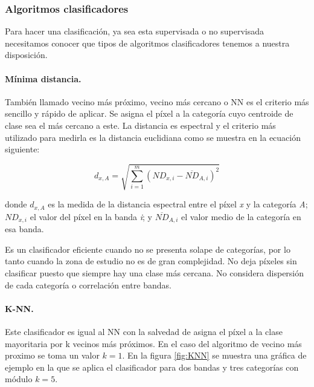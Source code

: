 \subsubsection{Algoritmos clasificadores}
Para hacer una clasificación, ya sea esta supervisada o no supervisada necesitamos conocer que tipos de algoritmos clasificadores tenemos a nuestra disposición.

\paragraph{Mínima distancia.}
También llamado vecino más próximo, vecino más cercano o \ac{NN} es el criterio más sencillo y rápido de aplicar. Se asigna el píxel a la categoría cuyo centroide de clase sea el más cercano a este.  La distancia es espectral y el criterio más utilizado para medirla es la distancia euclidiana como se muestra en la ecuación siguiente:

\begin{equation}
d_{x,A}=\sqrt{\displaystyle\sum_{i=1}^{m}(ND_{x,i}-\overline{ND}_{A,i})^{2}}
\end{equation}%

\noindent donde $d_{x,A}$ es la medida de la distancia espectral entre el píxel \textit{x} y la categoría \textit{A}; $ND_{x,i}$ el valor del píxel en la banda \textit{i}; y $\overline{ND}_{A,i}$ el valor medio de la categoría en esa banda.%

Es un clasificador eficiente cuando no se presenta solape de categorías, por lo tanto cuando la zona de estudio no es de gran complejidad. No deja píxeles sin clasificar puesto que siempre hay una clase más cercana. No considera dispersión de cada categoría o correlación entre bandas.

\paragraph{\ac{K-NN}.}
Este clasificador es igual al \ac{NN} con la salvedad de asigna el píxel a la clase mayoritaria por k vecinos más próximos. En el caso del algoritmo de vecino más proximo se toma un valor $k=1$. En la figura \ref{fig:KNN} se muestra una gráfica de ejemplo en la que se aplica el clasificador para dos bandas y tres categorías con módulo $k=5$.

